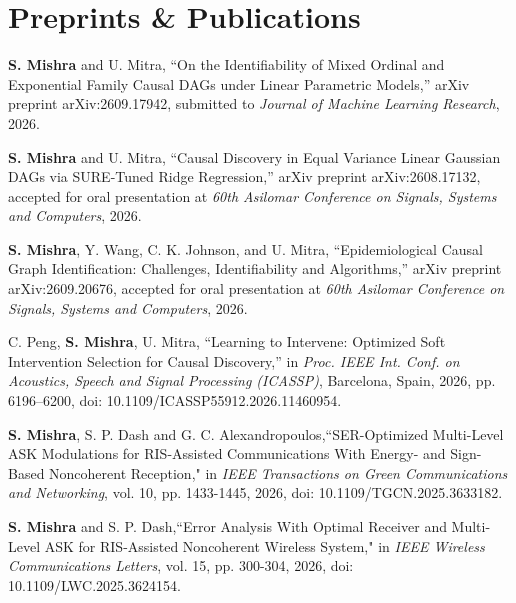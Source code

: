 \documentclass[10pt,letterpaper]{article}
\begin{document}
\section{Preprints \& Publications}
\small \begin{enumerate}[leftmargin=*, label={[\arabic*]}]
    \item \textbf{S. Mishra} and U. Mitra, ``On the Identifiability of Mixed Ordinal and Exponential Family Causal DAGs under Linear Parametric Models,'' arXiv preprint arXiv:2609.17942, submitted to \textit{Journal of Machine Learning Research}, 2026.

    \item \textbf{S. Mishra} and U. Mitra, ``Causal Discovery in Equal Variance Linear Gaussian DAGs via SURE-Tuned Ridge Regression,'' arXiv preprint arXiv:2608.17132, accepted for oral presentation at \textit{60th Asilomar Conference on Signals, Systems and Computers}, 2026.

    \item \textbf{S. Mishra}, Y. Wang, C. K. Johnson, and U. Mitra, ``Epidemiological Causal Graph Identification: Challenges, Identifiability and Algorithms,'' arXiv preprint arXiv:2609.20676, accepted for oral presentation at \textit{60th Asilomar Conference on Signals, Systems and Computers}, 2026.

    \item  C. Peng, \textbf{S. Mishra}, U. Mitra, ``Learning to Intervene: Optimized Soft Intervention Selection for Causal Discovery,'' in \textit{Proc. IEEE Int. Conf. on Acoustics, Speech and Signal Processing (ICASSP)}, Barcelona, Spain, 2026, pp. 6196--6200, doi: 10.1109/ICASSP55912.2026.11460954.

    \item \textbf{S. Mishra}, S. P. Dash and G. C. Alexandropoulos,``SER-Optimized Multi-Level ASK Modulations for RIS-Assisted Communications With Energy- and Sign-Based Noncoherent Reception," in \emph{IEEE Transactions on Green Communications and Networking}, vol. 10, pp. 1433-1445, 2026, doi: 10.1109/TGCN.2025.3633182.

    \item \textbf{S. Mishra} and S. P. Dash,``Error Analysis With Optimal Receiver and Multi-Level ASK for RIS-Assisted Noncoherent Wireless System," in \emph{IEEE Wireless Communications Letters}, vol. 15, pp. 300-304, 2026, doi: 10.1109/LWC.2025.3624154.

\end{enumerate}
\end{document}

